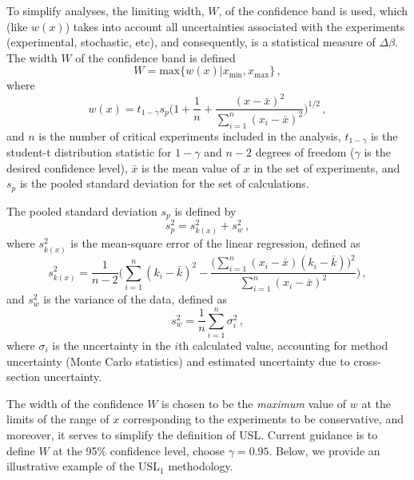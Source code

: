 To simplify analyses, the limiting width, $W$, of the confidence band is 
used, which (like $w(x)$) takes into account all uncertainties associated 
with the experiments (\eg experimental, stochastic, etc), and consequently, 
is a statistical measure of $\Delta \beta$.  The width $W$ of the 
confidence band is defined
\begin{equation}
 W = \mathrm{max} \Big \{ w(x) | x_{\mathrm{min}},x_{\mathrm{max}} \Big \} \, ,
\label{eq:confwidth}
\end{equation}
where
\begin{equation}
 w(x) = t_{1-\gamma} s_p \Bigg ( 1 + \frac{1}{n} + 
        \frac{(x-\bar{x})^2}{\sum^n_{i=1} (x_i - \bar{x})^2} \Bigg )^{1/2} \, ,
\end{equation}
and $n$ is the number of critical experiments included in the analysis, 
$t_{1-\gamma}$ is the student-t distribution statistic for $1-\gamma$ 
and $n-2$ degrees of freedom ($\gamma$ is the desired confidence level), 
$\bar{x}$ is the mean value of $x$ in the set of experiments, and $s_p$ 
is the pooled standard deviation for the set of calculations.

The pooled standard deviation $s_p$ is defined by
\begin{equation}
 s^2_p = s^2_{k(x)} + s^2_w \, ,
\end{equation}
where $s^2_{k(x)}$ is the mean-square error of the linear regression, 
defined as
\begin{equation}
 s^2_{k(x)} = \frac{1}{n-2} \Bigg ( \sum^n_{i=1} (k_i - \bar{k})^2 - 
              \frac{\Big(\sum^n_{i=1} (x_i-\bar{x})(k_i -\bar{k}) \Big )^2 }
                   {\sum^n_{i=1} (x_i - \bar{x})^2} \Bigg ) \, ,
\end{equation}
and $s^2_w$ is the variance of the data, defined as
\begin{equation}
 s^2_w = \frac{1}{n} \sum^n_{i=1} \sigma^2_i \, ,
\end{equation}
where  $\sigma_i$ is the uncertainty in the $i$th calculated value, 
accounting for method uncertainty (\eg Monte Carlo statistics) and 
estimated uncertainty due to cross-section uncertainty.

The width of the confidence $W$ is chosen to be the \textit{ maximum} value 
of $w$ at the limits of the range of $x$ corresponding to the experiments 
to be conservative, and moreover, it serves to simplify the definition of 
USL.  Current guidance is to define $W$ at the 95\% confidence level, 
\ie choose $\gamma = 0.95$.  Below, we provide an
illustrative example of the USL$_1$ methodology.

